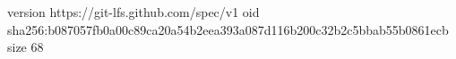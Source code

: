 version https://git-lfs.github.com/spec/v1
oid sha256:b087057fb0a00c89ca20a54b2eea393a087d116b200c32b2c5bbab55b0861ecb
size 68
